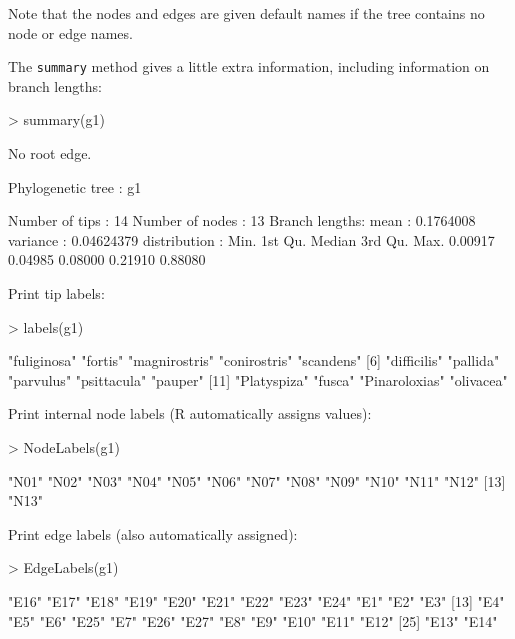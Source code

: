 \documentclass{article}
\newcommand{\code}[1]{{{\tt #1}}}
\begin{document}
Note that the nodes and edges are given default names if the tree contains no node or edge names.

The \code{summary} method gives a little extra information, including information on branch lengths:
\begin{Schunk}
\begin{Sinput}
> summary(g1)
\end{Sinput}
\begin{Soutput}
  No root edge.

 Phylogenetic tree : g1 

 Number of tips    : 14 
 Number of nodes   : 13 
 Branch lengths:
        mean         : 0.1764008 
        variance     : 0.04624379 
        distribution :
   Min. 1st Qu.  Median 3rd Qu.    Max. 
0.00917 0.04985 0.08000 0.21910 0.88080 
\end{Soutput}
\end{Schunk}

Print tip labels:
\begin{Schunk}
\begin{Sinput}
> labels(g1)
\end{Sinput}
\begin{Soutput}
 [1] "fuliginosa"   "fortis"       "magnirostris" "conirostris"  "scandens"    
 [6] "difficilis"   "pallida"      "parvulus"     "psittacula"   "pauper"      
[11] "Platyspiza"   "fusca"        "Pinaroloxias" "olivacea"    
\end{Soutput}
\end{Schunk}

Print internal node labels (R automatically assigns values):
\begin{Schunk}
\begin{Sinput}
> NodeLabels(g1)
\end{Sinput}
\begin{Soutput}
 [1] "N01" "N02" "N03" "N04" "N05" "N06" "N07" "N08" "N09" "N10" "N11" "N12"
[13] "N13"
\end{Soutput}
\end{Schunk}

Print edge labels (also automatically assigned):
\begin{Schunk}
\begin{Sinput}
> EdgeLabels(g1)
\end{Sinput}
\begin{Soutput}
 [1] "E16" "E17" "E18" "E19" "E20" "E21" "E22" "E23" "E24" "E1"  "E2"  "E3" 
[13] "E4"  "E5"  "E6"  "E25" "E7"  "E26" "E27" "E8"  "E9"  "E10" "E11" "E12"
[25] "E13" "E14"
\end{Soutput}
\end{Schunk}
\end{document}
